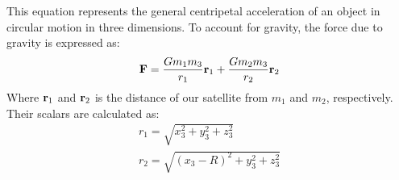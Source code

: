 This equation represents the general centripetal acceleration of an object in circular motion in three dimensions.
To account for gravity, the force due to gravity is expressed as:
\begin{gather*}
	\bm{\mathbf{F}} = \frac{Gm_1m_3}{r_1}\bm{\mathbf{r}}_1 + \frac{Gm_2m_3}{r_2}\bm{\mathbf{r}}_2
\end{gather*}
Where $\bm{\mathbf{r}}_1$ and $\bm{\mathbf{r}}_2$ is the distance of our satellite from $m_1$ and $m_2$, respectively.
Their scalars are calculated as:
\begin{gather*}
	r_1 = \sqrt{x_3^2 + y_3^2 + z_3^2} \\
	r_2 = \sqrt{(x_3 - R)^2 + y_3^2 + z_3^2} 
\end{gather*}
